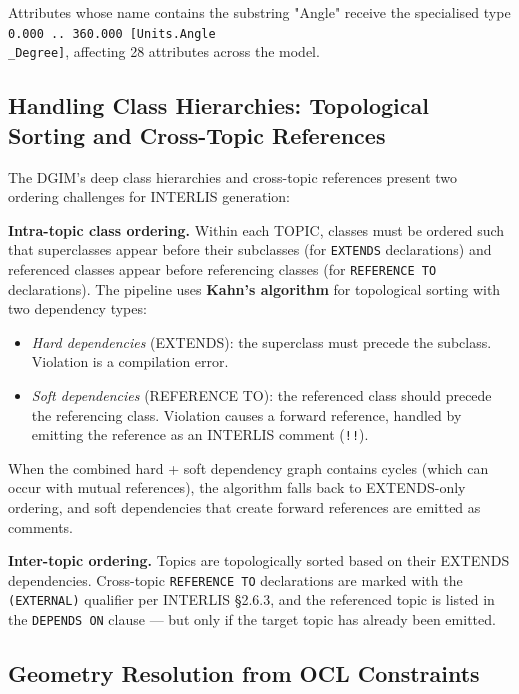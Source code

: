 \documentclass[conference]{IEEEtran}
\begin{document}
Attributes whose name contains the substring "Angle" receive the specialised type \texttt{0.000 .. 360.000 [Units.Angle\\_Degree]}, affecting 28 attributes across the model.

\subsection{Handling Class Hierarchies: Topological Sorting and Cross-Topic References}

The DGIM's deep class hierarchies and cross-topic references present two ordering challenges for INTERLIS generation:

\textbf{Intra-topic class ordering.} Within each TOPIC, classes must be ordered such that superclasses appear before their subclasses (for \texttt{EXTENDS} declarations) and referenced classes appear before referencing classes (for \texttt{REFERENCE TO} declarations). The pipeline uses \textbf{Kahn's algorithm} for topological sorting with two dependency types:

\begin{itemize}[leftmargin=*]
\item \textit{Hard dependencies} (EXTENDS): the superclass must precede the subclass. Violation is a compilation error.
\item \textit{Soft dependencies} (REFERENCE TO): the referenced class should precede the referencing class. Violation causes a forward reference, handled by emitting the reference as an INTERLIS comment (\texttt{!!}).
\end{itemize}

When the combined hard + soft dependency graph contains cycles (which can occur with mutual references), the algorithm falls back to EXTENDS-only ordering, and soft dependencies that create forward references are emitted as comments.

\textbf{Inter-topic ordering.} Topics are topologically sorted based on their EXTENDS dependencies. Cross-topic \texttt{REFERENCE TO} declarations are marked with the \texttt{(EXTERNAL)} qualifier per INTERLIS §2.6.3, and the referenced topic is listed in the \texttt{DEPENDS ON} clause — but only if the target topic has already been emitted.

\subsection{Geometry Resolution from OCL Constraints}
\end{document}

